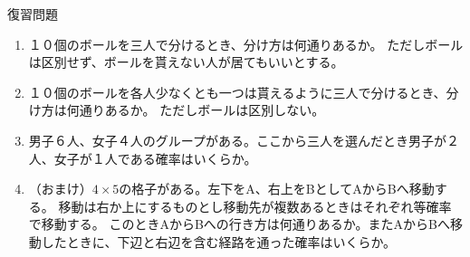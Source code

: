 \documentclass[12pt,a4paper]{jsarticle}
\begin{document}
復習問題
\begin{enumerate}
    \item １０個のボールを三人で分けるとき、分け方は何通りあるか。
    ただしボールは区別せず、ボールを貰えない人が居てもいいとする。
    \item １０個のボールを各人少なくとも一つは貰えるように三人で分けるとき、分け方は何通りあるか。
    ただしボールは区別しない。
    \item 男子６人、女子４人のグループがある。ここから三人を選んだとき男子が２人、女子が１人である確率はいくらか。
    \item （おまけ）$4\times 5$の格子がある。左下をA、右上をBとしてAからBへ移動する。
    移動は右か上にするものとし移動先が複数あるときはそれぞれ等確率で移動する。
    このときAからBへの行き方は何通りあるか。またAからBへ移動したときに、下辺と右辺を含む経路を通った確率はいくらか。
\end{enumerate}
\end{document}
